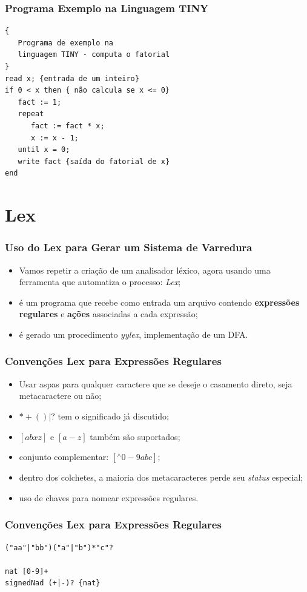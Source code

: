 \documentclass[table]{beamer}
\begin{document}
\begin{frame}[fragile]
   \frametitle{Programa Exemplo na Linguagem TINY}
   \begin{verbatim}
{
   Programa de exemplo na 
   linguagem TINY - computa o fatorial
}
read x; {entrada de um inteiro}
if 0 < x then { não calcula se x <= 0}
   fact := 1;
   repeat
      fact := fact * x;
      x := x - 1;
   until x = 0;
   write fact {saída do fatorial de x}
end
   \end{verbatim}
\end{frame}

\section{Lex}
\begin{frame}
   \frametitle{Uso do Lex para Gerar um Sistema de Varredura}
   \begin{itemize}
      \item Vamos repetir a criação de um analisador léxico, agora usando uma ferramenta que automatiza o processo: \textit{Lex};
      \item é um programa que recebe como entrada um arquivo contendo \textbf{expressões regulares} e \textbf{ações} associadas a cada expressão;
      \item é gerado um procedimento \textit{yylex}, implementação de um DFA.
   \end{itemize}
\end{frame}

\begin{frame}
   \frametitle{Convenções Lex para Expressões Regulares}
   \begin{itemize}
      \item Usar aspas para qualquer caractere que se deseje o casamento direto, seja metacaractere ou não;
      \item $* + ( ) | ?$ tem o significado já discutido;
      \item $[abxz]$ e  $[a-z]$ também são suportados;
      \item conjunto complementar: $[^\wedge0-9abc]$;
      \item dentro dos colchetes, a maioria dos metacaracteres perde seu \textit{status} especial;
      \item uso de chaves para nomear expressões regulares.
   \end{itemize}
\end{frame}

\begin{frame}[fragile]
   \frametitle{Convenções Lex para Expressões Regulares}
   \begin{verbatim}
("aa"|"bb")("a"|"b")*"c"?

nat [0-9]+
signedNad (+|-)? {nat}
   \end{verbatim}
\end{frame}
\end{document}
